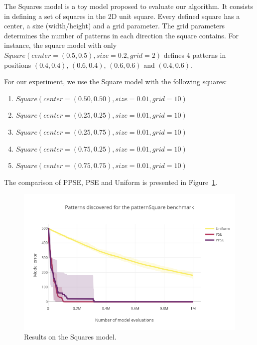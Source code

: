 \documentclass[10pt,letterpaper]{article}
\theoremstyle{definition}
\theoremstyle{remark}
\begin{document}
The Squares model is a toy model proposed to evaluate our algorithm.
It consists in defining a set of squares in the 2D unit square.
Every defined square has a center, a size (width/height) and a grid parameter.
The grid parameters determines the number of patterns in each direction the square contains.
For instance, the square model with only $Square(center=(0.5,0.5), size=0.2, grid=2)$ defines 4 patterns in positions $(0.4,0.4)$, $(0.6,0.4)$, $(0.6,0.6)$ and $(0.4,0.6)$.

For our experiment, we use the Square model with the following squares:
\begin{enumerate}
  \item[] $Square(center=(0.50, 0.50), size=0.01, grid=10)$
  \item[] $Square(center=(0.25, 0.25), size=0.01, grid=10)$
  \item[] $Square(center=(0.25, 0.75), size=0.01, grid=10)$
  \item[] $Square(center=(0.75, 0.25), size=0.01, grid=10)$
  \item[] $Square(center=(0.75, 0.75), size=0.01, grid=10)$
\end{enumerate}
      
The comparison of PPSE, PSE and Uniform is presented in Figure~\ref{fig:plot_squares}.

\begin{figure}
    \centering
    \includegraphics[width=0.9\linewidth]{images/plot_patternSquare.png}
    \caption{Results on the Squares model. }
    \label{fig:plot_squares}
\end{figure}


\end{document}
